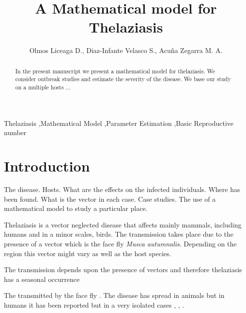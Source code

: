\documentclass[preprint,12pt]{elsarticle}
\begin{document}
\begin{frontmatter}

\title{A Mathematical model for Thelaziasis}

\author{Olmos Liceaga D., Diaz-Infante Velasco S., Acu\~na Zegarra M. A.}
\address{Universidad de Sonora}
\begin{abstract}
In the present manuscript we present a mathematical model for thelaziasis. 
We consider outbreak studies and estimate the severity of the disease. 
We base our study on a multiple hosts ...
\end{abstract}

\begin{keyword}
Thelaziasis \sep Mathematical Model \sep Parameter Estimation \sep Basic Reproductive number


\end{keyword}

\end{frontmatter}

\linenumbers

\section{Introduction}
\label{Section:Intro}

\noindent The disease. Hosts. What are the effects on the infected individuals. 
Where has been found. What is the vector in each case. Case studies. 
The use of a mathematical model to study a particular place.

\noindent Thelaziasis is a vector neglected disease that affects mainly mammals, including humans and in a minor scales, 
birds. The transmission takes place due to the presence of a vector which is the face fly \textit{Musca autumnalis}. 
Depending on the region this vector might vary as well as the host species.

\noindent The transmission depends upon the presence of vectors and therefore thelaziasis has a seasonal occurrence \cite{Asrat:2016}

\noindent The transmitted by the face fly \cite{Otranto:2003}. The disease has spread in animals but in humans it has been reported but in a very isolated cases \cite{Wang:2014}, \cite{Otranto:2008}, \cite{shen:2006}.\\
\end{document}
